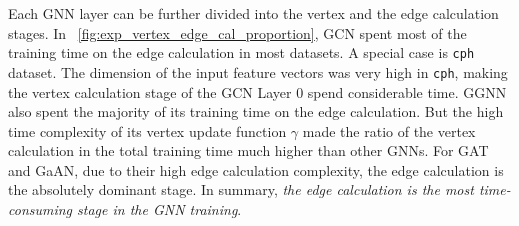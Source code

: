 Each GNN layer can be further divided into the vertex and the edge calculation stages.
In \figurename~\ref{fig:exp_vertex_edge_cal_proportion}, GCN spent most of the training time on the edge calculation in most datasets.
A special case is \texttt{cph} dataset.
The dimension of the input feature vectors was very high in \texttt{cph}, making the vertex calculation stage of the GCN Layer 0 spend considerable time.
GGNN also spent the majority of its training time on the edge calculation.
But the high time complexity of its vertex update function $\gamma$ made the ratio of the vertex calculation in the total training time much higher than other GNNs.
For GAT and GaAN, due to their high edge calculation complexity, the edge calculation is the absolutely dominant stage.
In summary, \emph{the edge calculation is the most time-consuming stage in the GNN training}.

